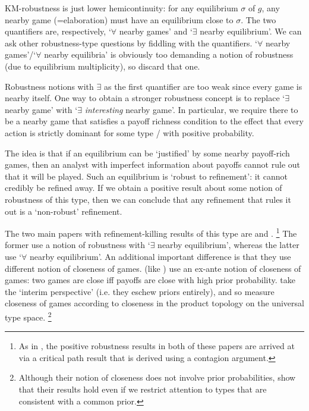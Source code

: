 \documentclass[11pt,letterpaper,reqno,oneside]{article}
\begin{document}
KM-robustness is just lower hemicontinuity: for any equilibrium $\sigma$ of $g$, any nearby game (=elaboration) must have an equilibrium close to $\sigma$. The two quantifiers are, respectively, `$\forall$ nearby games' and `$\exists$ nearby equilibrium'. We can ask other robustness-type questions by fiddling with the quantifiers. `$\forall$ nearby games'/`$\forall$ nearby equilibria' is obviously too demanding a notion of robustness (due to equilibrium multiplicity), so discard that one.

Robustness notions with $\exists$ as the first quantifier are too weak since every game is nearby itself. One way to obtain a stronger robustness concept is to replace `$\exists$ nearby game' with `$\exists$ \emph{interesting} nearby game'. In particular, we require there to be a nearby game that satisfies a payoff richness condition to the effect that every action is strictly dominant for some type / with positive probability.

The idea is that if an equilibrium can be `justified' by some nearby payoff-rich games, then an analyst with imperfect information about payoffs cannot rule out that it will be played. Such an equilibrium is `robust to refinement': it cannot credibly be refined away. If we obtain a positive result about some notion of robustness of this type, then we can conclude that any refinement that rules it out is a `non-robust' refinement.

The two main papers with refinement-killing results of this type are \textcite{DekelFudenberg1990} and \textcite{WeinsteinYildiz2007}.%
	\footnote{As in \textcite{KajiiMorris1997ecta}, the positive robustness results in both of these papers are arrived at via a critical path result that is derived using a contagion argument.}
The former use a notion of robustness with `$\exists$ nearby equilibrium', whereas the latter use `$\forall$ nearby equilibrium'. An additional important difference is that they use different notion of closeness of games. \textcite{DekelFudenberg1990} (like \textcite{KajiiMorris1997ecta}) use an ex-ante notion of closeness of games: two games are close iff payoffs are close with high prior probability. \textcite{WeinsteinYildiz2007} take the `interim perspective' (i.e. they eschew priors entirely), and so measure closeness of games according to closeness in the product topology on the universal type space.%
	\footnote{Although their notion of closeness does not involve prior probabilities, \textcite{WeinsteinYildiz2007} show that their results hold even if we restrict attention to types that are consistent with a common prior.}
\end{document}
